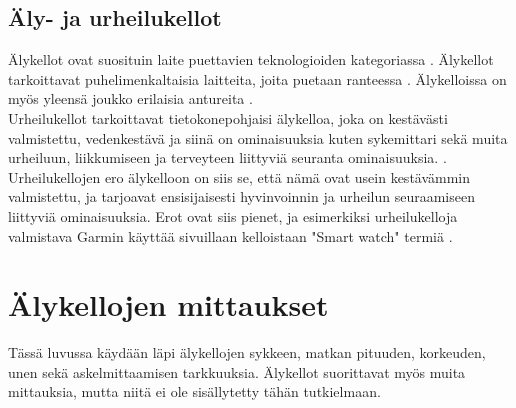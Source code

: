 \documentclass[utf8,bachelor,finnish]{bachelor}
\begin{document}
  \section{Äly- ja urheilukellot}
  Älykellot ovat suosituin laite puettavien teknologioiden kategoriassa \parencite{godfrey2018z}.
   Älykellot tarkoittavat puhelimenkaltaisia laitteita, joita puetaan ranteessa \parencite{Gregersen_watch_2023}.
    Älykelloissa on myös yleensä joukko erilaisia antureita \parencite{rawassizadeh_wearables_2014}.\\

  Urheilukellot tarkoittavat tietokonepohjaisi älykelloa, joka on kestävästi valmistettu, vedenkestävä ja siinä on ominaisuuksia kuten
    sykemittari sekä muita urheiluun, liikkumiseen ja terveyteen liittyviä seuranta ominaisuuksia. \parencite{sportswatch_tfd}. Urheilukellojen ero älykelloon on siis se,
     että nämä ovat usein kestävämmin valmistettu, ja tarjoavat ensisijaisesti hyvinvoinnin ja urheilun seuraamiseen liittyviä ominaisuuksia. Erot ovat siis pienet, 
      ja esimerkiksi urheilukelloja valmistava Garmin käyttää sivuillaan kelloistaan "Smart watch" termiä \parencite{garmin_site}. \\
  
  \chapter{Älykellojen mittaukset}
  Tässä luvussa käydään läpi älykellojen sykkeen, matkan pituuden, korkeuden, unen sekä askelmittaamisen tarkkuuksia.
   Älykellot suorittavat myös muita mittauksia, mutta niitä ei ole sisällytetty tähän tutkielmaan.\\
\end{document}
